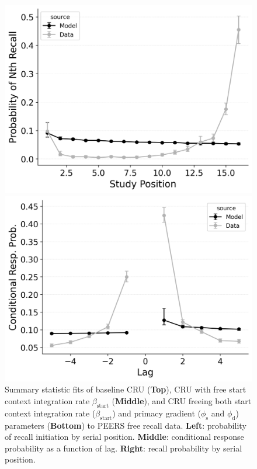 \documentclass[
  man,
  floatsintext,
  longtable,
  nolmodern,
  notxfonts,
  notimes,
  draftfirst,
  colorlinks=true,linkcolor=blue,citecolor=blue,urlcolor=blue]{apa7}
\begin{document}
\begin{figure}

\caption{\label{fig-initiation}Summary statistic fits of baseline CRU
(\textbf{Top}), CRU with free start context integration rate
\(\beta_\text{start}\) (\textbf{Middle}), and CRU freeing both start
context integration rate (\(\beta_\text{start}\)) and primacy gradient
(\(\phi_\text{s}\) and \(\phi_\text{d}\)) parameters (\textbf{Bottom})
to PEERS free recall data. \textbf{Left}: probability of recall
initiation by serial position. \textbf{Middle}: conditional response
probability as a function of lag. \textbf{Right}: recall probability by
serial position.}

\begin{minipage}{0.33\linewidth}
\includegraphics{figures/bw_HealeyKahana2014_BaseCRU_Fitting_pnr.png}\end{minipage}%
%
\begin{minipage}{0.33\linewidth}
\includegraphics{figures/bw_HealeyKahana2014_BaseCRU_Fitting_crp.png}\end{minipage}%

\end{figure}
\end{document}
